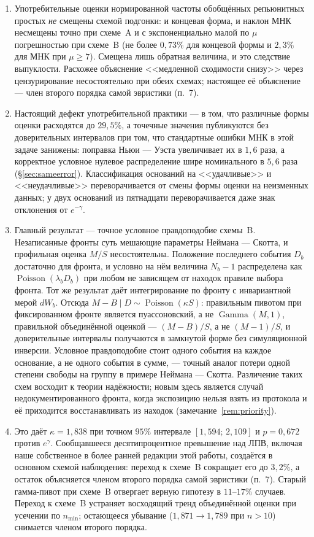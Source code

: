 \documentclass[11pt,a4paper]{article}
\theoremstyle{plain}
\theoremstyle{remark}
\newcommand{\eg}{e^{\gamma}}
\newcommand{\emg}{e^{-\gamma}}
\DeclareMathOperator{\Gam}{Gamma}
\DeclareMathOperator{\Pois}{Poisson}
\begin{document}
\begin{enumerate}
\item Употребительные оценки нормированной частоты обобщённых репьюнитных простых
\emph{не} смещены схемой подгонки: и концевая форма, и наклон МНК несмещены точно при
схеме~A и с экспоненциально малой по $\mu$ погрешностью при схеме~B (не более
$0{,}73\%$ для концевой формы и $2{,}3\%$ для МНК при $\mu\ge7$).
Смещена лишь обратная величина, и это следствие выпуклости. Расхожее объяснение
<<медленной сходимости снизу>> через цензурирование несостоятельно при обеих схемах;
настоящее её объяснение --- член второго порядка самой эвристики (п.~7).

\item Настоящий дефект употребительной практики --- в том, что различные формы оценки
расходятся до $29{,}5\%$, а точечные значения публикуются без доверительных интервалов
при том, что стандартные ошибки МНК в этой задаче занижены: поправка Ньюи ---
Уэста увеличивает их в $1{,}6$ раза, а корректное условное нулевое распределение
шире номинального в $5{,}6$ раза (\S\ref{sec:sameerror}).
Классификация оснований на <<удачливые>> и <<неудачливые>> переворачивается от смены
формы оценки на неизменных данных; у двух оснований из пятнадцати переворачивается
даже знак отклонения от $\emg$.

\item Главный результат --- точное условное правдоподобие схемы~B. Незаписанные
фронты суть мешающие параметры Неймана --- Скотта, и профильная оценка $M/S$
несостоятельна. Положение последнего события $D_b$ достаточно для фронта, и
условно на нём величина $N_b-1$ распределена как $\Pois(\lambda_bD_b)$ при любом
не зависящем от находок правиле выбора фронта. Тот же результат даёт
интегрирование по фронту с инвариантной мерой $dW_b$. Отсюда $M-B\mid D\sim\Pois(\kappa S)$:
правильным пивотом при фиксированном фронте является пуассоновский, а не
$\Gam(M,1)$, правильной объединённой оценкой --- $(M-B)/S$, а не $(M-1)/S$, и
доверительные интервалы получаются в замкнутой форме без симуляционной инверсии.
Условное правдоподобие стоит одного события на каждое основание, а не одного
события в сумме, --- точный аналог потери одной степени свободы на группу в
примере Неймана --- Скотта. Различение таких схем восходит к теории надёжности; новым здесь
является случай недокументированного фронта, когда экспозицию нельзя взять из
протокола и её приходится восстанавливать из находок
(замечание~\ref{rem:priority}).

\item Это даёт $\hat\kappa=1{,}838$ при точном $95\%$ интервале $[1{,}594;\,2{,}109]$ и
$p=0{,}672$ против $\eg$. Сообщавшееся десятипроцентное превышение над ЛПВ, включая
наше собственное в более ранней редакции этой работы, создаётся в основном схемой
наблюдения: переход к схеме~B сокращает его до $3{,}2\%$, а остаток объясняется
членом второго порядка самой эвристики (п.~7). Старый гамма-пивот при схеме~B
отвергает верную гипотезу в $11$--$17\%$ случаев. Переход к схеме~B устраняет
восходящий тренд объединённой оценки при усечении по $n_{\min}$; остающееся
убывание ($1{,}871\to1{,}789$ при $n>10$) снимается членом второго порядка.


\end{enumerate}
\end{document}
